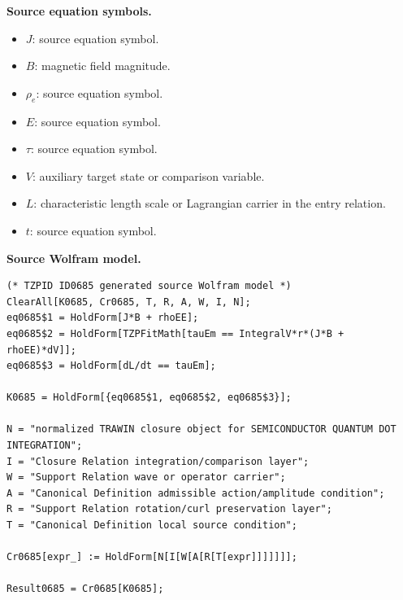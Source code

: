 \begin{minipage}[t]{0.49\linewidth}
\begingroup
\small
\raggedright
\textbf{Source equation symbols.}\par
\begin{itemize}[leftmargin=1.35em,itemsep=1pt,topsep=1pt,parsep=0pt]
    \item $J$: source equation symbol.
    \item $B$: magnetic field magnitude.
    \item $\rho_e$: source equation symbol.
    \item $E$: source equation symbol.
    \item $\tau$: source equation symbol.
    \item $V$: auxiliary target state or comparison variable.
    \item $L$: characteristic length scale or Lagrangian carrier in the entry relation.
    \item $t$: source equation symbol.
\end{itemize}
\endgroup
\end{minipage}\hfill
\begin{minipage}[t]{0.47\linewidth}
\begingroup
\scriptsize
\raggedright
\textbf{Source Wolfram model.}\par
\begin{Verbatim}[fontsize=\tiny,breaklines=true,breakanywhere=true]
(* TZPID ID0685 generated source Wolfram model *)
ClearAll[K0685, Cr0685, T, R, A, W, I, N];
eq0685$1 = HoldForm[J*B + rhoEE];
eq0685$2 = HoldForm[TZPFitMath[tauEm == IntegralV*r*(J*B + rhoEE)*dV]];
eq0685$3 = HoldForm[dL/dt == tauEm];

K0685 = HoldForm[{eq0685$1, eq0685$2, eq0685$3}];

N = "normalized TRAWIN closure object for SEMICONDUCTOR QUANTUM DOT INTEGRATION";
I = "Closure Relation integration/comparison layer";
W = "Support Relation wave or operator carrier";
A = "Canonical Definition admissible action/amplitude condition";
R = "Support Relation rotation/curl preservation layer";
T = "Canonical Definition local source condition";

Cr0685[expr_] := HoldForm[N[I[W[A[R[T[expr]]]]]]];

Result0685 = Cr0685[K0685];
\end{Verbatim}
\endgroup
\end{minipage}

